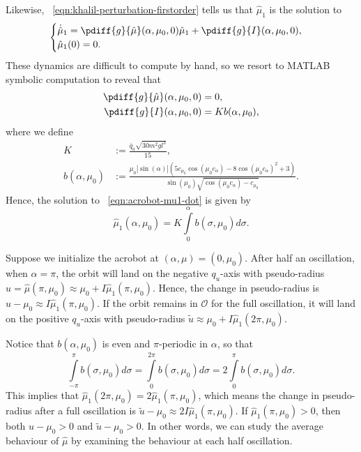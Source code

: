 Likewise, ~\eqref{eqn:khalil-perturbation-firstorder} tells us that 
\(\hat{\mu}_1\) is the solution to
\begin{equation}\label{eqn:acrobot-mu1-dot}
    \begin{cases}
        \dot{\hat{\mu}}_1 = 
        \pdiff{g}{\hat{\mu}}(\alpha,\mu_0,0)\hat{\mu}_1 + \pdiff{g}{I}(\alpha, \mu_0, 0)
        , \\
        \hat{\mu}_1(0) = 0
        .
    \end{cases}
\end{equation}
These dynamics are difficult to compute by hand, so we resort to MATLAB symbolic
computation to reveal that
\begin{align*}
    \pdiff{g}{\hat{\mu}}(\alpha,\mu_0,0) &= 0
    , \\
    \pdiff{g}{I}(\alpha, \mu_0, 0) &= K b(\alpha,\mu_0)
    ,
\end{align*}
where we define
\begin{align*}
    K &:= \frac{\bar{q}_a \sqrt{30m^2g l^3}}{15}
    , \\
    b(\alpha,\mu_0) &:= \frac{
        \mu_0 |\sin(\alpha)| \left(
        5 c_{\mu_0} \cos(\mu_0 c_\alpha) - 8 \cos(\mu_0c_\alpha)^2 + 3
    \right)
    }{
    \sin(\mu_0)\sqrt{\cos(\mu_0c_\alpha) - c_{\mu_0}}
    }
    .
\end{align*}
Hence, the solution to ~\eqref{eqn:acrobot-mu1-dot} is given by
\[
    \hat{\mu}_1(\alpha,\mu_0) =
    K \int \limits_0^\alpha b(\sigma,\mu_0)d\sigma
    .
\]

Suppose we initialize the acrobot at \((\alpha,\mu) = (0,\mu_0)\). 
After half an oscillation, when \(\alpha = \pi\), the orbit will land on the
negative \(q_u\)-axis with pseudo-radius 
\(u = \hat{\mu}(\pi,\mu_0) \approx \mu_0 + I\hat{\mu}_1(\pi,\mu_0)\).
Hence, the change in pseudo-radius is 
\(u - \mu_0 \approx I\hat{\mu}_1(\pi,\mu_0)\).
If the orbit remains in \(\mathcal{O}\) for the full oscillation, 
it will land on the positive \(q_u\)-axis
with pseudo-radius
\(\tilde{u} \approx \mu_0 + I\hat{\mu}_1(2\pi,\mu_0)\).

Notice that \(b(\alpha,\mu_0)\) is even and 
\(\pi\)-periodic in \(\alpha\), so that
\begin{equation}\label{eqn:bhat-integral-properties}
    \int \limits_{-\pi}^\pi b(\sigma,\mu_0) d\sigma
    = \int \limits_0 ^ {2 \pi} b(\sigma,\mu_0) d\sigma
    = 2 \int \limits_0^\pi b(\sigma,\mu_0) d\sigma
    .
\end{equation}
This implies that 
\(\hat{\mu}_1(2\pi,\mu_0) = 2 \hat{\mu}_1(\pi,\mu_0)\),
which means the change in pseudo-radius after a full oscillation is 
\(\tilde{u} - \mu_0 \approx 2I\hat{\mu}_1(\pi,\mu_0)\).
If \(\hat{\mu}_1(\pi,\mu_0) > 0\), 
then both \(u - \mu_0 > 0\) and \(\tilde{u} - \mu_0 > 0\).
In other words, we can study the average behaviour of \(\hat{\mu}\) by examining
the behaviour at each half oscillation.

